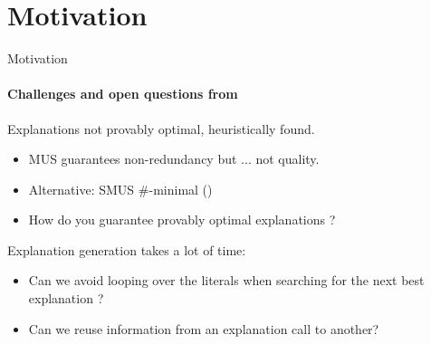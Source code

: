 \documentclass{beamer}
\renewcommand\emph[1]{{\color{vuborange}#1}}
\begin{document}
	\section{Motivation}
	\begin{frame}{Motivation}
		\framesubtitle{Challenges and open questions from \cite{bogaerts2020step}}
		
		\begin{description}[font=\color{vuborange}\itshape]
			\item[Optimality] Explanations not provably optimal, \emph{heuristically} found.
			\begin{itemize}
				\item[$\triangleright$] MUS guarantees non-redundancy but ... not quality.
				\item[$\triangleright$] Alternative: SMUS $\#$-minimal (\cite{ignatiev2015smallest})
			\end{itemize} \pause
			\begin{itemize}
				\item[Q1] How do you guarantee provably optimal explanations ?\pause
			\end{itemize}
		\end{description}
		
		\begin{description}[font=\color{vuborange}\itshape]
			
			\item[Efficiency] Explanation generation takes a lot of time: \pause
			\begin{itemize}
				\item[Q2] Can we avoid looping over the literals when searching for the next best explanation ?\pause
				\item[Q3] Can we reuse information from an explanation call to another?
			\end{itemize}
		\end{description}
		
	\end{frame}
	
\end{document}
